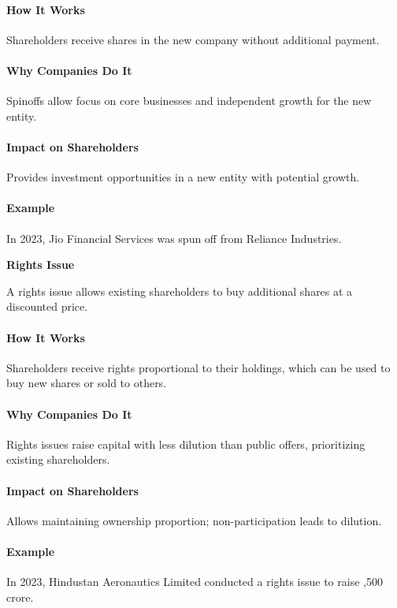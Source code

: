 \documentclass[12pt]{article}
\begin{document}
\paragraph{How It Works}
Shareholders receive shares in the new company without additional payment.

\paragraph{Why Companies Do It}
Spinoffs allow focus on core businesses and independent growth for the new entity.

\paragraph{Impact on Shareholders}
Provides investment opportunities in a new entity with potential growth.

\paragraph{Example}
In 2023, Jio Financial Services was spun off from Reliance Industries.

\textbf{Rights Issue}

A rights issue allows existing shareholders to buy additional shares at a discounted price.

\paragraph{How It Works}
Shareholders receive rights proportional to their holdings, which can be used to buy new shares or sold to others.

\paragraph{Why Companies Do It}
Rights issues raise capital with less dilution than public offers, prioritizing existing shareholders.

\paragraph{Impact on Shareholders}
Allows maintaining ownership proportion; non-participation leads to dilution.

\paragraph{Example}
In 2023, Hindustan Aeronautics Limited conducted a rights issue to raise ,500 crore.
\end{document}
